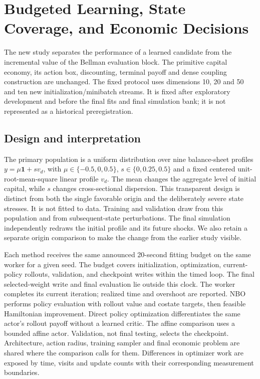 \section{Budgeted Learning, State Coverage, and Economic Decisions}\label{sec:r12study}
The new study separates the performance of a learned candidate from the incremental value of the Bellman evaluation block. The primitive capital economy, its action box, discounting, terminal payoff and dense coupling construction are unchanged. The fixed protocol uses dimensions 10, 20 and 50 and ten new initialization/minibatch streams. It is fixed after exploratory development and before the final fits and final simulation bank; it is not represented as a historical preregistration.

\subsection{Design and interpretation}
The primary population is a uniform distribution over nine balance-sheet profiles $y=\mu\bm1+sv_d$, with $\mu\in\{-0.5,0,0.5\}$, $s\in\{0,0.25,0.5\}$ and a fixed centered unit-root-mean-square linear profile $v_d$. The mean changes the aggregate level of initial capital, while $s$ changes cross-sectional dispersion. This transparent design is distinct from both the single favorable origin and the deliberately severe state stresses. It is not fitted to data. Training and validation draw from this population and from subsequent-state perturbations. The final simulation independently redraws the initial profile and its future shocks. We also retain a separate origin comparison to make the change from the earlier study visible.

Each method receives the same announced 20-second fitting budget on the same worker for a given seed. The budget covers initialization, optimization, current-policy rollouts, validation, and checkpoint writes within the timed loop. The final selected-weight write and final evaluation lie outside this clock. The worker completes its current iteration; realized time and overshoot are reported. NBO performs policy evaluation with rollout value and costate targets, then feasible Hamiltonian improvement. Direct policy optimization differentiates the same actor's rollout payoff without a learned critic. The affine comparison uses a bounded affine actor. Validation, not final testing, selects the checkpoint. Architecture, action radius, training sampler and final economic problem are shared where the comparison calls for them. Differences in optimizer work are exposed by time, visits and update counts with their corresponding measurement boundaries.


